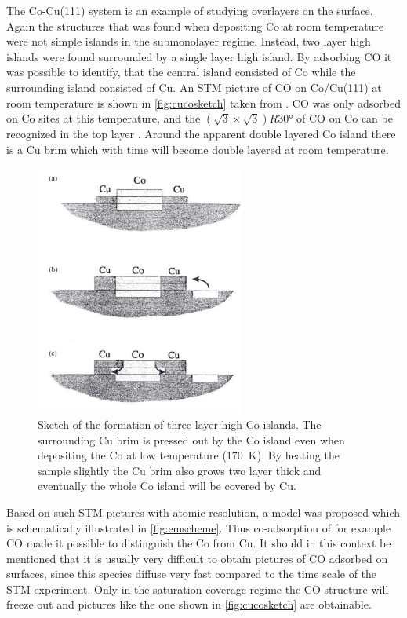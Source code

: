 The Co-Cu(111) system is an example of studying overlayers on the surface. Again the structures that was found when depositing Co at room temperature were not simple islands in the submonolayer regime. Instead, two layer high islands were found surrounded by a single layer high island. By adsorbing CO it was possible to identify,  that the central island consisted of Co while the surrounding island consisted of Cu. An STM picture of CO on Co/Cu(111) at room temperature is shown in \autoref{fig:cucosketch} taken from \cite{Morten}. CO was only adsorbed on Co sites at this temperature, and the $(\sqrt{3}\times\sqrt{3})R\ang{30}$ of CO on Co can be recognized in the top layer \cite{Morten}. Around the apparent double layered Co island there is a Cu brim which with time will become double layered at room temperature. 

\begin{figure}[h!]
	\begin{center}
	\includegraphics[scale=4]{figures/10_14.png}
	\caption{Sketch of the formation of three layer high Co islands. The surrounding Cu brim is pressed out by the Co island even when depositing the Co at low temperature (\SI{170}{K}). By heating the sample slightly the Cu brim also grows two layer thick and eventually the whole Co island will be covered by Cu.}
	\label{fig:cucosketch}
	\end{center}
\end{figure}

Based on such STM pictures with atomic resolution, a model was proposed which is schematically illustrated in \autoref{fig:emscheme}. Thus co-adsorption of for example CO made it possible to distinguish the Co from Cu. It should in this context be mentioned that it is usually very difficult to obtain pictures of CO adsorbed on surfaces, since this species diffuse very fast compared to the time scale of the STM experiment. Only in the saturation coverage regime the CO structure will freeze out and pictures like the one shown in \autoref{fig:cucosketch} are  obtainable.

